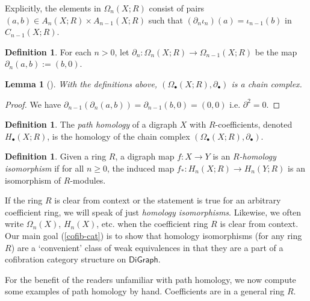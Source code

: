 \documentclass[11pt]{article}
\newtheorem{lemma}[theo]{Lemma}
\theoremstyle{definition}
\newtheorem{defi}[theo]{Definition}
\numberwithin{equation}{section}
\newcommand{\DiGraph}{\mathsf{DiGraph}}
\newcommand{\bd}{\partial}
\newcommand{\from}{\colon}
\begin{document}
Explicitly, the elements in $\Omega_n (X; R)$ consist of pairs  $(a,b) \in  A_n (X ; R) \times A_{n-1} (X ; R)$ such that $(\bd_n \iota_n)(a)=\iota_{n-1}(b)$ in $C_{n-1} (X ; R)$.

\begin{defi}
    For each $n > 0$, let $\bd_n\colon \Omega_n (X; R) \to\Omega_{n-1} (X; R)$ be the map $\bd_n(a,b) := (b,0)$.
\end{defi}

\begin{lemma}[{\cite[\S2.4]{grigor'yan-lin-muranov-yau:unpublished}}]
    With the definitions above, $(\Omega_\bullet (X; R), \bd_\bullet)$ is a chain complex.
\end{lemma}
\begin{proof}
    We have $\bd_{n-1} (\bd_n (a,b)) = \bd_{n-1} (b,0) = (0,0)$ i.e. $\bd^2 = 0$.
\end{proof}

\begin{defi}
The \emph{path homology} of a digraph $X$ with $R$-coefficients, denoted $H_\bullet (X ; R)$, is the homology of the chain complex $(\Omega_\bullet (X ; R), \bd_\bullet)$.
\end{defi}


\begin{defi} \label{def:homology-iso}
    Given a ring $R$, a digraph map $f \from X \to Y$ is an \emph{$R$-homology isomorphism} if for all $n \geq 0$, the induced map $f_* \from H_n(X; R) \to H_n(Y; R)$ is an isomorphism of $R$-modules.
\end{defi}

If the ring $R$ is clear from context or the statement is true for an arbitrary coefficient ring, we will speak of just \emph{homology isomorphisms}.
Likewise, we often write $\Omega_n (X)$, $H_n (X)$, etc. when the coefficient ring $R$ is clear from context.
Our main goal (\cref{cofib-cat}) is to show that homology isomorphisms (for any ring $R$) are a `convenient' class of weak equivalences in that they are a part of a cofibration category structure on $\DiGraph$.

For the benefit of the readers unfamiliar with path homology, we now compute some examples of path homology by hand.
Coefficients are in a general ring $R$.
\end{document}
